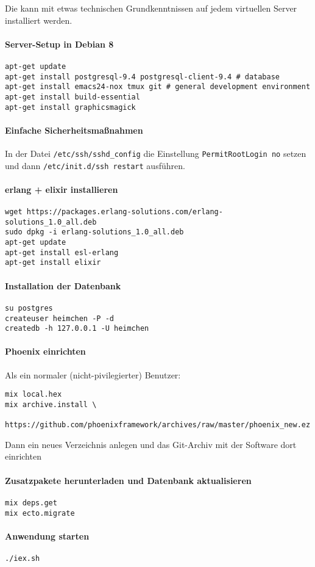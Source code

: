 \documentclass[12pt]{scrreprt}
\begin{document}
Die \DB{} kann mit etwas technischen Grundkenntnissen auf jedem
virtuellen Server installiert werden.


\paragraph{Server-Setup in Debian 8}

\begin{verbatim}
apt-get update
apt-get install postgresql-9.4 postgresql-client-9.4 # database
apt-get install emacs24-nox tmux git # general development environment
apt-get install build-essential
apt-get install graphicsmagick
\end{verbatim}

\paragraph{Einfache Sicherheitsmaßnahmen}

In der Datei \verb|/etc/ssh/sshd_config| die Einstellung \verb|PermitRootLogin no| setzen und dann
\verb|/etc/init.d/ssh restart| ausführen.

\paragraph{erlang + elixir installieren}

\begin{verbatim}
wget https://packages.erlang-solutions.com/erlang-solutions_1.0_all.deb 
sudo dpkg -i erlang-solutions_1.0_all.deb
apt-get update
apt-get install esl-erlang
apt-get install elixir
\end{verbatim}


\paragraph{Installation der Datenbank}
\begin{verbatim}
su postgres
createuser heimchen -P -d
createdb -h 127.0.0.1 -U heimchen
\end{verbatim}

\paragraph{Phoenix einrichten}

Als ein normaler (nicht-pivilegierter) Benutzer:

\begin{verbatim}
mix local.hex
mix archive.install \
    https://github.com/phoenixframework/archives/raw/master/phoenix_new.ez
\end{verbatim}


Dann ein neues Verzeichnis anlegen und das Git-Archiv mit der Software
dort einrichten


\paragraph{Zusatzpakete herunterladen und Datenbank aktualisieren}
\begin{verbatim}
mix deps.get
mix ecto.migrate
\end{verbatim}

\paragraph{Anwendung starten}

\begin{verbatim}
./iex.sh
\end{verbatim}
\end{document}

